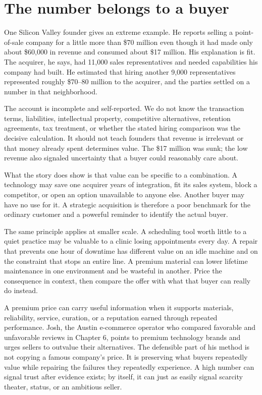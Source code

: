 \section{The number belongs to a buyer}

One Silicon Valley founder gives an extreme example. He reports selling a
point-of-sale company for a little more than \$70 million even though it had
made only about \$60,000 in revenue and consumed about \$17 million. His
explanation is fit. The acquirer, he says, had 11,000 sales representatives and
needed capabilities his company had built. He estimated that hiring another
9,000 representatives represented roughly \$70--80 million to the acquirer,
and the parties settled on a number in that neighborhood.

The account is incomplete and self-reported. We do not know the transaction
terms, liabilities, intellectual property, competitive alternatives, retention
agreements, tax treatment, or whether the stated hiring comparison was the
decisive calculation. It should not teach founders that revenue is irrelevant
or that money already spent determines value. The \$17 million was sunk; the
low revenue also signaled uncertainty that a buyer could reasonably care about.

What the story does show is that value can be specific to a combination. A
technology may save one acquirer years of integration, fit its sales system,
block a competitor, or open an option unavailable to anyone else. Another
buyer may have no use for it. A strategic acquisition is therefore a poor
benchmark for the ordinary customer and a powerful reminder to identify the
actual buyer.

The same principle applies at smaller scale. A scheduling tool worth little to
a quiet practice may be valuable to a clinic losing appointments every day. A
repair that prevents one hour of downtime has different value on an idle
machine and on the constraint that stops an entire line. A premium material can
lower lifetime maintenance in one environment and be wasteful in another.
Price the consequence in context, then compare the offer with what that buyer
can really do instead.

A premium price can carry useful information when it supports materials,
reliability, service, curation, or a reputation earned through repeated
performance. Josh, the Austin e-commerce operator who compared favorable and
unfavorable reviews in Chapter 6, points to premium technology brands and urges
sellers to outvalue their alternatives. The defensible part of his method is
not copying a famous company's price. It is preserving what buyers repeatedly
value while repairing the failures they repeatedly experience. A high number
can signal trust after evidence exists; by itself, it can just as easily signal
scarcity theater, status, or an ambitious seller.

